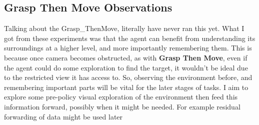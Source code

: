 \subsection{Grasp Then Move Observations}
Talking about the Grasp\_ThenMove, literally have never ran this yet.
What I got from these experiments was that the agent can benefit from understanding its surroundings at a higher level, and more importantly remembering them. This is because once  camera becomes obstructed, as with \textbf{Grasp Then Move}, even if the agent could do some exploration to find the target, it wouldn't be ideal due to the restricted view it has access to. So, observing the environment before, and remembering important parts will be vital for the later stages of tasks. I aim to explore some pre-policy visual exploration of the environment then feed this information forward, possibly when it might be needed. For example residual forwarding of data might be used later 

